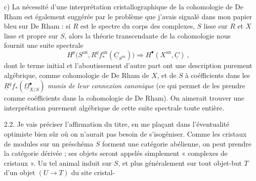 \documentclass[11pt,a4paper]{article}
\begin{document}
c) La nécessité d'une interprétation cristallographique de la cohomologie de
De Rham est également suggérée par le problème que j'avais signalé dans mon
papier bleu sur De Rham : si $R$ est le spectre du corps des complexes, $S$
lisse sur $R$ et $X$ lisse et propre sur $S$, alors la théorie transcendante
de la cohomologie nous fournit une suite spectrale
\[
  H^p\bigl(S^{\mathrm{an}},R^qf^{\mathrm{an}}_*(\underline{C}_{S^{\mathrm{an}}})\bigr)
  \Longrightarrow H^{\bullet}(X^{\mathrm{an}},\underline{C})\ ,
\]
dont le terme initial et l'aboutissement d'autre part ont une description
purement algébrique, comme cohomologie de De Rham de $X$, et de $S$ à
coéfficients dans les $\underline{R}^qf_*(\underline{\Omega}^{\bullet}_{X/S})$
\emph{munis de leur connexion canonique}  (ce qui permet de
les prendre comme coéfficients dans la cohomologie de De Rham). On aimerait
trouver une interprétation purement algébrique de cette suite spectrale toute
entière.

2.2. Je vais préciser \struck{\ill{}} l'affirmation du titre, en me plaçant
dans l'éventualité optimiste bien sûr où on n'aurait pas besoin de
s'isogéniser.
 Comme les cristaux de modules sur un préschéma $S$ forment une
catégorie abélienne, on peut prendre la catégorie dérivée ; ses objets seront
appelés simplement « complexes de cristaux ». Un tel animal induit sur $S$,
et plus généralement sur tout objet-but $T$ d'un objet $(U\to T)$ du site
cristal-
\end{document}
